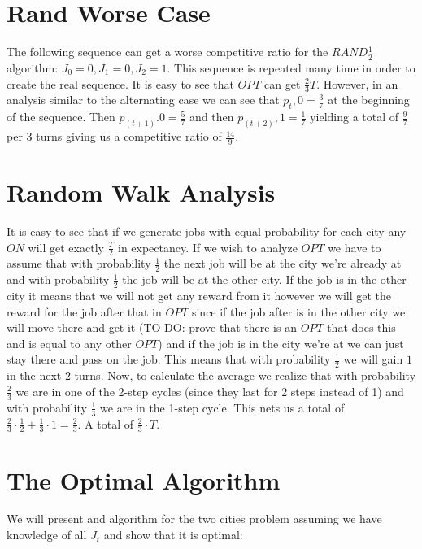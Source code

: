 \documentclass[]{article}
\newcommand{\rand}{ $ RAND \frac{1}{2} $ }
\begin{document}
\section{Rand Worse Case}

The following sequence can get a worse competitive ratio for the \rand algorithm: $ J_0 = 0, J_1=0, J_2 = 1 $. This sequence is repeated many time in order to create the real sequence. It is easy to see that $ OPT $ can get $ \frac{2}{3}T $. However, in an analysis similar to the alternating case we can see that $ p_t,0 = \frac{3}{7} $ at the beginning of the sequence. Then $ p_(t+1).0 = \frac{5}{7} $ and then $ p_(t+2),1 = \frac{1}{7} $ yielding a total of $ \frac{9}{7} $ per $ 3 $ turns giving us a competitive ratio of $ \frac{14}{9} $.

\section{Random Walk Analysis}

It is easy to see that if we generate jobs with equal probability for each city any $ ON $ will get exactly $ \frac{T}{2} $ in expectancy. If we wish to analyze $ OPT $ we have to assume that with probability $ \frac{1}{2} $ the next job will be at the city we're already at and with probability $ \frac{1}{2} $ the job will be at the other city. If the job is in the other city it means that we will not get any reward from it however we will get the reward for the job after that in $ OPT $ since if the job after is in the other city we will move there and get it (TO DO: prove that there is an $ OPT $ that does this and is equal to any other $ OPT $) and if the job is in the city we're at we can just stay there and pass on the job. This means that with probability $ \frac{1}{2} $ we will gain $ 1 $ in the next $ 2 $ turns. Now, to calculate the average we realize that with probability $ \frac{2}{3} $ we are in one of the 2-step cycles (since they last for 2 steps instead of 1) and with probability $ \frac{1}{3} $ we are in the 1-step cycle. This nets us a total of $ \frac{2}{3} \cdot \frac{1}{2} + \frac{1}{3} \cdot 1 = \frac{2}{3} $. A total of $ \frac{2}{3} \cdot T $.

\section{The Optimal Algorithm}

We will present and algorithm for the two cities problem assuming we have knowledge of all $ J_t $ and show that it is optimal:
\end{document}
